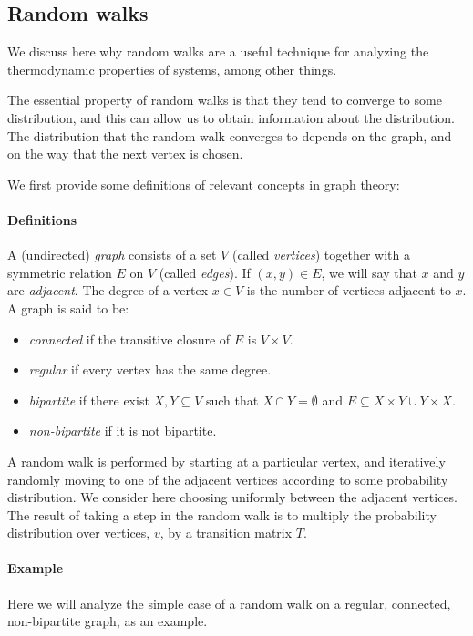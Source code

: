 \documentclass{article}
\begin{document}
\subsection{Random walks}
We discuss here why random walks are a useful technique for analyzing the thermodynamic properties of systems, among other things.

The essential property of random walks is that they tend to converge to some distribution, and this can allow us to obtain information about the distribution.
The distribution that the random walk converges to depends on the graph, and on the way that the next vertex is chosen.

We first provide some definitions of relevant concepts in graph theory:
\paragraph{Definitions}
A (undirected) \emph{graph} consists of a set $V$ (called \emph{vertices}) together with a symmetric relation $E$ on $V$ (called \emph{edges}).
If $(x, y) \in E$, we will say that $x$ and $y$ are \emph{adjacent}.
The degree of a vertex $x \in V$ is the number of vertices adjacent to $x$.
A graph is said to be:
\begin{itemize}
\item \emph{connected} if the transitive closure of $E$ is $V\times V$.
\item \emph{regular} if every vertex has the same degree.
\item \emph{bipartite} if there exist $X, Y \subseteq V$ such that $X\cap Y = \emptyset$ and $E \subseteq X\times Y \cup Y\times X$.
\item \emph{non-bipartite} if it is not bipartite.
\end{itemize}

A random walk is performed by starting at a particular vertex, and iteratively randomly moving to one of the adjacent vertices according to some probability distribution.
We consider here choosing uniformly between the adjacent vertices.
The result of taking a step in the random walk is to multiply the probability distribution over vertices, $v$, by a transition matrix $T$.

\paragraph{Example}
Here we will analyze the simple case of a random walk on a regular, connected, non-bipartite graph, as an example.
\end{document}
